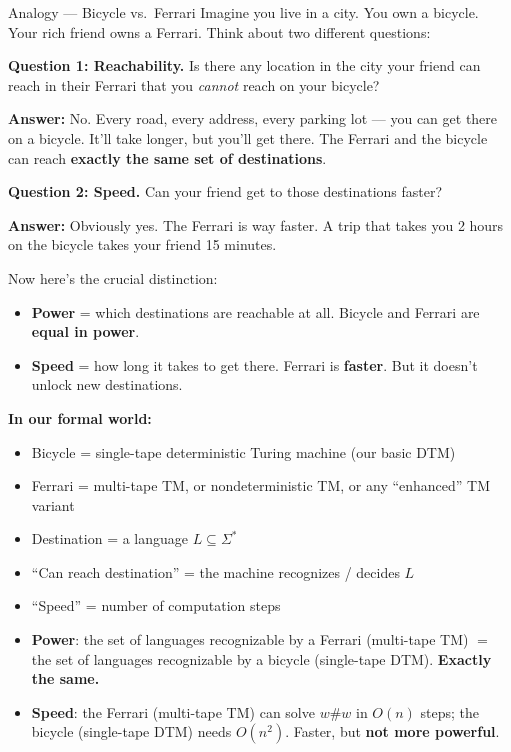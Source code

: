 \begin{notebox}{Analogy --- Bicycle vs.\ Ferrari}
Imagine you live in a city. You own a bicycle. Your rich friend owns a Ferrari. Think about two different questions:

\textbf{Question 1: Reachability.} Is there any location in the city your friend can reach in their Ferrari that you \textit{cannot} reach on your bicycle?

\textbf{Answer:} No. Every road, every address, every parking lot --- you can get there on a bicycle. It'll take longer, but you'll get there. The Ferrari and the bicycle can reach \textbf{exactly the same set of destinations}.

\textbf{Question 2: Speed.} Can your friend get to those destinations faster?

\textbf{Answer:} Obviously yes. The Ferrari is way faster. A trip that takes you 2 hours on the bicycle takes your friend 15 minutes.

Now here's the crucial distinction:
\begin{itemize}[nosep]
\item \textbf{Power} = which destinations are reachable at all. Bicycle and Ferrari are \textbf{equal in power}.
\item \textbf{Speed} = how long it takes to get there. Ferrari is \textbf{faster}. But it doesn't unlock new destinations.
\end{itemize}

\textbf{In our formal world:}
\begin{itemize}[nosep]
\item Bicycle = single-tape deterministic Turing machine (our basic DTM)
\item Ferrari = multi-tape TM, or nondeterministic TM, or any ``enhanced'' TM variant
\item Destination = a language $L \subseteq \Sigma^*$
\item ``Can reach destination'' = the machine recognizes / decides $L$
\item ``Speed'' = number of computation steps
\item \textbf{Power}: the set of languages recognizable by a Ferrari (multi-tape TM) $=$ the set of languages recognizable by a bicycle (single-tape DTM). \textbf{Exactly the same.}
\item \textbf{Speed}: the Ferrari (multi-tape TM) can solve $w\#w$ in $O(n)$ steps; the bicycle (single-tape DTM) needs $O(n^2)$. Faster, but \textbf{not more powerful}.
\end{itemize}
\end{notebox}

